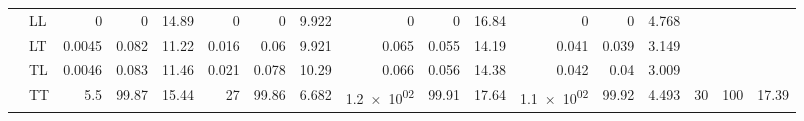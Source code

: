 \begin{table}
{\begin{tabular}{llrrrrrrrrrrrrrrr}
 & LL & \num{0} & \num{0} & \num{14.89} & \num{0} & \num{0} & \num{9.922} & \num{0} & \num{0} & \num{16.84} & \num{0} & \num{0} & \num{4.768} &  &  &  \\
 & LT & \num{0.0045} & \num{0.082} & \num{11.22} & \num{0.016} & \num{0.06} & \num{9.921} & \num{0.065} & \num{0.055} & \num{14.19} & \num{0.041} & \num{0.039} & \num{3.149} &  &  &  \\
 & TL & \num{0.0046} & \num{0.083} & \num{11.46} & \num{0.021} & \num{0.078} & \num{10.29} & \num{0.066} & \num{0.056} & \num{14.38} & \num{0.042} & \num{0.04} & \num{3.009} &  &  &  \\
 & TT & \num{5.5} & \num{99.87} & \num{15.44} & \num{27} & \num{99.86} & \num{6.682} & \num{1.2e+02} & \num{99.91} & \num{17.64} & \num{1.1e+02} & \num{99.92} & \num{4.493} & \num{30} & \num{100} & \num{17.39} \\
\bottomrule
\end{tabular}
}%
\end{table}